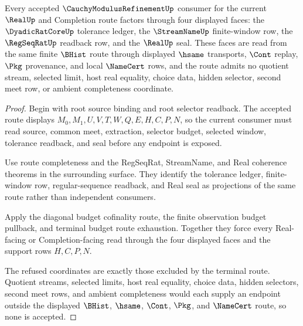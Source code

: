 \begin{theorem}
\label{thm:cauchy-modulus-refinement-current-phase-spine}
Every accepted $\CauchyModulusRefinementUp$ consumer for the current $\RealUp$ and Completion route factors through four displayed faces: the $\DyadicRatCoreUp$ tolerance ledger, the $\StreamNameUp$ finite-window row, the $\RegSeqRatUp$ readback row, and the $\RealUp$ seal. These faces are read from the same finite $\BHist$ route through displayed $\hsame$ transports, $\Cont$ replay, $\Pkg$ provenance, and local $\NameCert$ rows, and the route admits no quotient stream, selected limit, host real equality, choice data, hidden selector, second meet row, or ambient completeness coordinate.
\end{theorem}
\begin{proof}
Begin with root source binding and root selector readback. The accepted route displays $M_0,M_1,U,V,T,W,Q,E,H,C,P,N$, so the current consumer must read source, common meet, extraction, selector budget, selected window, tolerance readback, and seal before any endpoint is exposed.

Use route completeness and the RegSeqRat, StreamName, and Real coherence theorems in the surrounding surface. They identify the tolerance ledger, finite-window row, regular-sequence readback, and Real seal as projections of the same route rather than independent consumers.

Apply the diagonal budget cofinality route, the finite observation budget pullback, and terminal budget route exhaustion. Together they force every Real-facing or Completion-facing read through the four displayed faces and the support rows $H,C,P,N$.

The refused coordinates are exactly those excluded by the terminal route. Quotient streams, selected limits, host real equality, choice data, hidden selectors, second meet rows, and ambient completeness would each supply an endpoint outside the displayed $\BHist$, $\hsame$, $\Cont$, $\Pkg$, and $\NameCert$ route, so none is accepted.
\end{proof}


